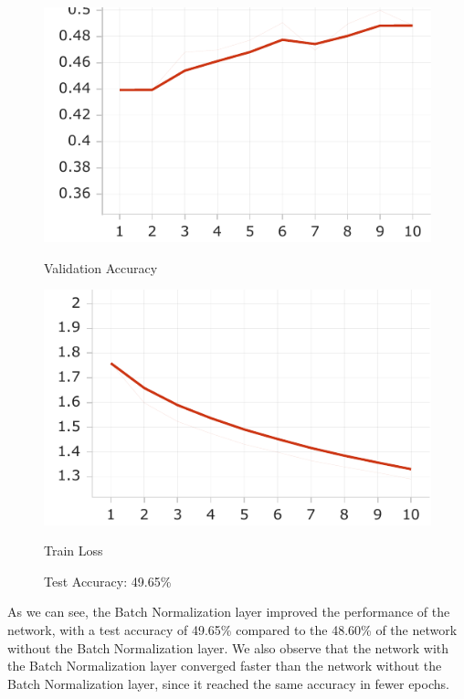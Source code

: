 \documentclass{article}
\begin{document}
\begin{figure}[H]
    \centering
    \begin{minipage}{0.45\textwidth}
        \centering
        \includegraphics[width=\linewidth]{images/torch_norm/Accuracy_validation-2.pdf}
        \caption{Validation Accuracy}
    \end{minipage} \hfill
    \begin{minipage}{0.45\textwidth}
        \centering
        \includegraphics[width=\linewidth]{images/torch_norm/Loss_train-3.pdf}
        \caption{Train Loss}
    \end{minipage}
    \caption{Test Accuracy: 49.65\%}
\end{figure}

As we can see, the Batch Normalization layer improved the performance of the network, with a test accuracy of 49.65\%
compared to the 48.60\% of the network without the Batch Normalization layer. We also observe that the network with
the Batch Normalization layer converged faster than the network without the Batch Normalization layer, since
it reached the same accuracy in fewer epochs.
\end{document}
